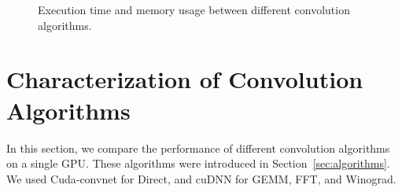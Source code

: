 \begin{figure}[!t]
  \centering
  \hfil
  \caption{Execution time and memory usage between different convolution algorithms.}
  \label{fig_conv_time}
\end{figure}%

\section{Characterization of Convolution Algorithms}
\label{convolution-algorithms}
In this section, we compare the performance of different convolution algorithms on a single GPU. These algorithms were introduced in Section~\ref{sec:algorithms}.
We used Cuda-convnet for \textsf{Direct}, and cuDNN for \textsf{GEMM}, \textsf{FFT}, and \textsf{Winograd}.

